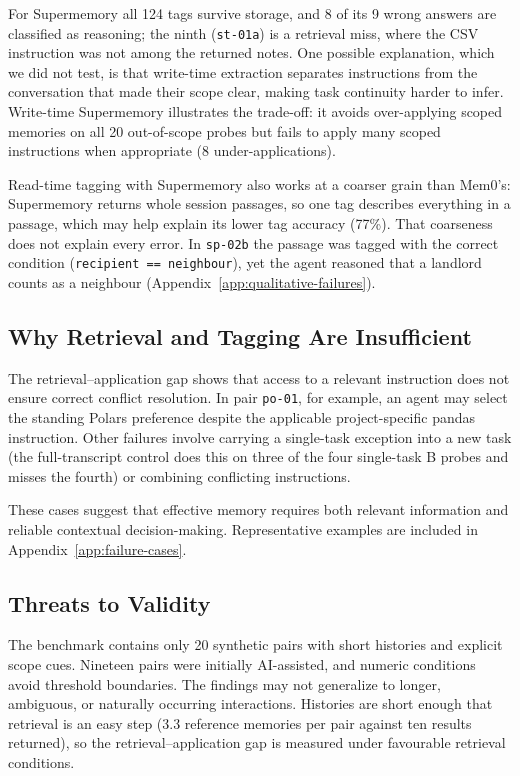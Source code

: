 \documentclass[11pt,a4paper]{article}
\begin{document}
For Supermemory all 124 tags survive storage, and 8 of
its 9 wrong answers are classified as reasoning; the
ninth (\texttt{st-01a}) is a retrieval miss, where the CSV
instruction was not among the returned notes. One
possible explanation, which we did not test, is that
write-time extraction separates instructions from the
conversation that made their scope clear, making task
continuity harder to infer. Write-time Supermemory
illustrates the trade-off: it avoids over-applying
scoped memories on all 20 out-of-scope probes but
fails to apply many scoped instructions when
appropriate (8 under-applications).

Read-time tagging with Supermemory also works at a coarser
grain than Mem0's: Supermemory returns whole session
passages, so one tag describes everything in a passage, which
may help explain its lower tag accuracy (77\%). That coarseness
does not explain every error. In \texttt{sp-02b} the passage
was tagged with the correct condition (\texttt{recipient ==
neighbour}), yet the agent reasoned that a landlord counts as a
neighbour (Appendix~\ref{app:qualitative-failures}).

\subsection{Why Retrieval and Tagging Are Insufficient}

The retrieval--application gap shows that access
to a relevant instruction does not ensure correct
conflict resolution. In pair \texttt{po-01}, for
example, an agent may select the standing Polars
preference despite the applicable project-specific
pandas instruction. Other failures involve
carrying a single-task exception into a new task
(the full-transcript control does this on three of the four
single-task B probes and misses the fourth) or combining
conflicting instructions.

These cases suggest that effective memory requires
both relevant information and reliable contextual
decision-making. Representative examples are
included in Appendix~\ref{app:failure-cases}.

\subsection{Threats to Validity}

The benchmark contains only 20 synthetic pairs
with short histories and explicit scope cues.
Nineteen pairs were initially AI-assisted, and
numeric conditions avoid threshold boundaries.
The findings may not generalize to longer,
ambiguous, or naturally occurring interactions.
Histories are short enough that retrieval is an easy
step (3.3 reference memories per pair against ten results
returned), so the retrieval--application gap is measured
under favourable retrieval conditions.
\end{document}
